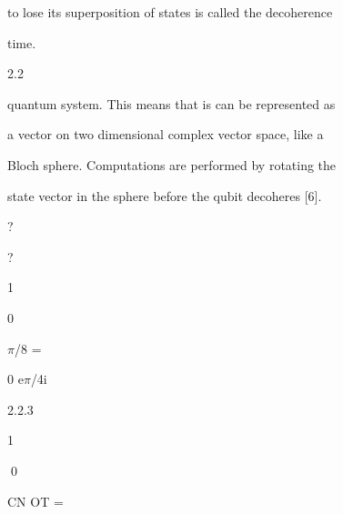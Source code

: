 \documentclass[a4paper,portrait,12pt]{article}
\begin{document}
\begin{flushleft}
to lose its superposition of states is called the decoherence
\end{flushleft}


\begin{flushleft}
time.
\end{flushleft}





2.2





\begin{flushleft}
quantum system. This means that is can be represented as
\end{flushleft}


\begin{flushleft}
a vector on two dimensional complex vector space, like a
\end{flushleft}


\begin{flushleft}
Bloch sphere. Computations are performed by rotating the
\end{flushleft}


\begin{flushleft}
state vector in the sphere before the qubit decoheres [6].
\end{flushleft}





?


?


1


0


\begin{flushleft}
$\pi$/8 =
\end{flushleft}


\begin{flushleft}
0 e$\pi$/4i
\end{flushleft}





2.2.3





1


\begin{flushleft}
0
\end{flushleft}


\begin{flushleft}
CN OT = 
\end{flushleft}
\end{document}
